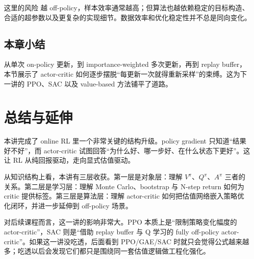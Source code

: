 \documentclass[a4paper]{article}
\begin{document}
\begin{warningbox}{这里的风险}
越 off-policy，样本效率通常越高；但算法也越依赖稳定的目标构造、合适的超参数以及更复杂的实现细节。数据效率和优化稳定性并不总是同向变化。
\end{warningbox}

\subsection{本章小结}
从单次 on-policy 更新，到 importance-weighted 多次更新，再到 replay buffer，本节展示了 actor-critic 如何逐步摆脱“每更新一次就得重新采样”的束缚。这为下一讲的 PPO、SAC 以及 value-based 方法铺平了道路。

\section{总结与延伸}
本讲完成了 online RL 里一个非常关键的结构升级。policy gradient 只知道“结果好不好”，而 actor-critic 试图回答“为什么好、哪一步好、在什么状态下更好”。这让 RL 从纯回报驱动，走向显式估值驱动。

从知识结构上看，本讲有三层收获。第一层是对象层：理解 \(V^\pi\)、\(Q^\pi\)、\(A^\pi\) 三者的关系。第二层是学习层：理解 Monte Carlo、bootstrap 与 N-step return 如何为 critic 提供标签。第三层是算法层：理解 actor-critic 如何把估值网络嵌入策略优化闭环，并进一步延伸到 off-policy 场景。

对后续课程而言，这一讲的影响非常大。PPO 本质上是“限制策略变化幅度的 actor-critic”，SAC 则是“借助 replay buffer 与 Q 学习的 fully off-policy actor-critic”。如果这一讲没吃透，后面看到 PPO/GAE/SAC 时就只会觉得公式越来越多；吃透以后会发现它们都只是围绕同一套估值逻辑做工程化强化。
\end{document}
